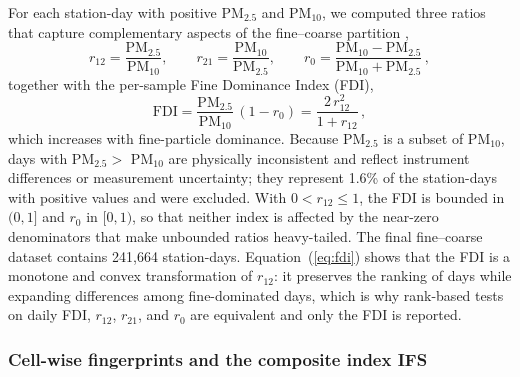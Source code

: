 \documentclass[a4paper,fleqn]{cas-sc}
\begin{document}
For each station-day with positive PM$_{2.5}$ and PM$_{10}$, we computed three ratios that capture complementary aspects of the fine--coarse partition \citep{Fan2021},
\begin{equation}
r_{12}=\frac{\mathrm{PM}_{2.5}}{\mathrm{PM}_{10}},\qquad
r_{21}=\frac{\mathrm{PM}_{10}}{\mathrm{PM}_{2.5}},\qquad
r_{0}=\frac{\mathrm{PM}_{10}-\mathrm{PM}_{2.5}}{\mathrm{PM}_{10}+\mathrm{PM}_{2.5}}\,,
\end{equation}
together with the per-sample Fine Dominance Index (FDI),
\begin{equation}
\mathrm{FDI}=\frac{\mathrm{PM}_{2.5}}{\mathrm{PM}_{10}}\,(1-r_{0})=\frac{2\,r_{12}^{2}}{1+r_{12}}\,,
\label{eq:fdi}
\end{equation}
which increases with fine-particle dominance. Because PM$_{2.5}$ is a subset of PM$_{10}$, days with PM$_{2.5}>$ PM$_{10}$ are physically inconsistent and reflect instrument differences or measurement uncertainty; they represent 1.6\% of the station-days with positive values and were excluded. With $0<r_{12}\le 1$, the FDI is bounded in $(0,1]$ and $r_0$ in $[0,1)$, so that neither index is affected by the near-zero denominators that make unbounded ratios heavy-tailed. The final fine--coarse dataset contains 241{,}664 station-days. Equation~(\ref{eq:fdi}) shows that the FDI is a monotone and convex transformation of $r_{12}$: it preserves the ranking of days while expanding differences among fine-dominated days, which is why rank-based tests on daily FDI, $r_{12}$, $r_{21}$, and $r_0$ are equivalent and only the FDI is reported.

\subsubsection{Cell-wise fingerprints and the composite index IFS}
\end{document}
